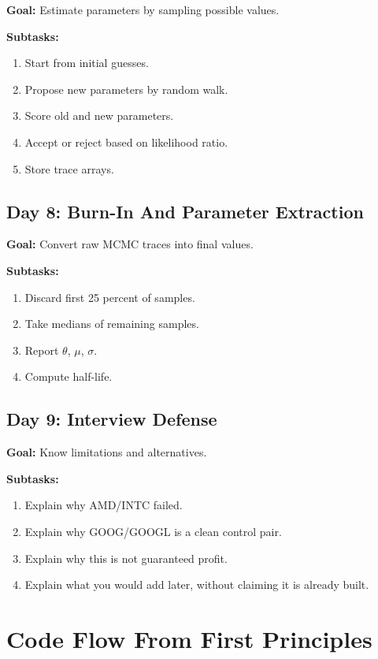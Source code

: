 \documentclass[11pt]{article}
\begin{document}
\textbf{Goal:} Estimate parameters by sampling possible values.

\textbf{Subtasks:}

\begin{enumerate}
  \item Start from initial guesses.
  \item Propose new parameters by random walk.
  \item Score old and new parameters.
  \item Accept or reject based on likelihood ratio.
  \item Store trace arrays.
\end{enumerate}

\subsection{Day 8: Burn-In And Parameter Extraction}

\textbf{Goal:} Convert raw MCMC traces into final values.

\textbf{Subtasks:}

\begin{enumerate}
  \item Discard first 25 percent of samples.
  \item Take medians of remaining samples.
  \item Report $\theta$, $\mu$, $\sigma$.
  \item Compute half-life.
\end{enumerate}

\subsection{Day 9: Interview Defense}

\textbf{Goal:} Know limitations and alternatives.

\textbf{Subtasks:}

\begin{enumerate}
  \item Explain why AMD/INTC failed.
  \item Explain why GOOG/GOOGL is a clean control pair.
  \item Explain why this is not guaranteed profit.
  \item Explain what you would add later, without claiming it is already built.
\end{enumerate}

\section{Code Flow From First Principles}
\end{document}
